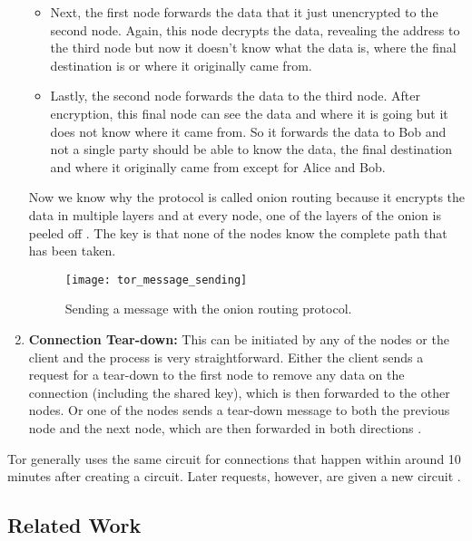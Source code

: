 \begin{enumerate}
\begin{itemize}
      \item Next, the first node forwards the data that it just unencrypted to the second node. Again, this node decrypts the data, revealing the address to the third node
        but now it doesn't know what the data is, where the final destination is or where it originally came from.

      \item Lastly, the second node forwards the data to the third node. After encryption, this final node can see the data and where it is going but it does not know where it came from.
        So it forwards the data to Bob and not a single party should be able to know the data, the final destination and where it originally came from except for Alice and Bob.
    \end{itemize}

    Now we know why the protocol is called onion routing because it encrypts the data in multiple layers and at every node, one of the layers of the onion is peeled off \cite{tor_project2}.
    The key is that none of the nodes know the complete path that has been taken.

    \begin{figure}[ht]
      \centering
      \texttt{[image: tor\_message\_sending]}
      \caption{Sending a message with the onion routing protocol.}
      \label{fig:tor_message_sending}
    \end{figure}

  \item \textbf{Connection Tear-down:} This can be initiated by any of the nodes or the client and the process is very straightforward.
    Either the client sends a request for a tear-down to the first node to remove any data on the connection (including the shared key), which is then forwarded to the other nodes.
    Or one of the nodes sends a tear-down message to both the previous node and the next node, which are then forwarded in both directions \cite{goldschlag1999onion}.

\end{enumerate}

Tor generally uses the same circuit for connections that happen within around 10 minutes after creating a circuit.
Later requests, however, are given a new circuit \cite{tor_project, tor_project2}.

\subsection{Related Work}

